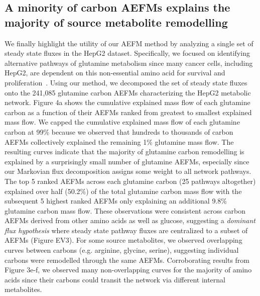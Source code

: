 \documentclass[12pt]{article}
\begin{document}



\subsection*{A minority of carbon AEFMs explains the majority of source metabolite remodelling}


We finally highlight the utility of our AEFM method by analyzing a single set
of steady state fluxes in the HepG2 dataset. Specifically, we focused on
identifying alternative pathways of glutamine metabolism since many cancer
cells, including HepG2, are dependent on this non-essential amino acid for
survival and proliferation~\citep{YeYanyan2023Gmri,YooHeeChan2020Gric}.
Using our method, we decomposed the set of steady state fluxes onto the
241,085 glutamine carbon AEFMs characterizing the HepG2 metabolic network.
Figure 4a shows the cumulative explained mass flow of each glutamine
carbon as a function of their AEFMs ranked from greatest to smallest
explained mass flow. We capped the cumulative explained mass flow of each
glutamine carbon at 99\% because we observed that hundreds to thousands of
carbon AEFMs collectively explained the remaining 1\% glutamine mass flow.
The resulting curves indicate that the majority of glutamine carbon
remodelling is explained by a surprisingly small number of glutamine
AEFMs, especially since our Markovian flux decomposition assigns some
weight to all network pathways. The top 5 ranked AEFMs across each
glutamine carbon (25 pathways altogether) explained over half (50.2\%) of
the total glutamine carbon mass flow with the subsequent
5 highest ranked AEFMs only explaining an additional 9.8\% glutamine
carbon mass flow. These observations were consistent across carbon AEFMs
derived from other amino acids as well as glucose, suggesting
a \emph{dominant flux hypothesis} where steady state pathway fluxes are
centralized to a subset of AEFMs (Figure EV3). For some source
metabolites, we observed overlapping curves between carbons (e.g.
arginine, glycine, serine), suggesting individual carbons were remodelled
through the same AEFMs. Corroborating results from Figure 3e-f, we
observed many non-overlapping curves for the majority of amino acids since
their carbons could transit the network via different internal
metabolites.
\end{document}
